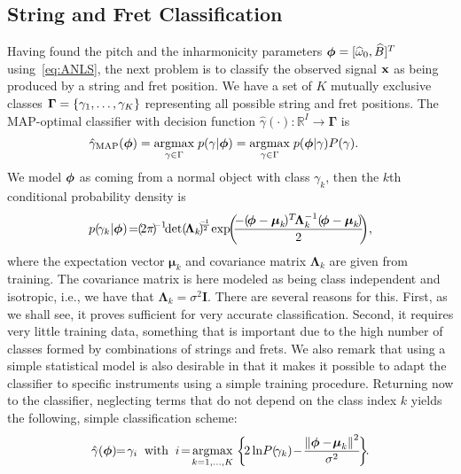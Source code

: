 \documentclass{article}
\begin{document}
\subsection{String and Fret Classification} %
\label{sec:proposed_classification_of_string_and_fret}
Having found the pitch and the inharmonicity parameters $\text{\boldmath$\phi$} = [\widehat\omega_0, \widehat B ]^T$ using~\eqref{eq:ANLS}, the next problem is to classify the observed signal $\mathbf x$ as being produced by a string and fret position. We have a set of $K$ mutually exclusive classes ${\mbox{\boldmath $\Gamma$}}=\{\gamma_1,\dots,\gamma_K\}$ representing all possible string and fret positions. The MAP-optimal classifier with decision function $\hat{\gamma}(\cdot)\!:\! \mathbb{R}^I \!\!\!\rightarrow \!\!\boldsymbol{\Gamma}  $ is~\cite{mspr}
\begin{align}
    \hat\gamma_{\textup{MAP}}(\text{\boldmath$\phi$}) &= \underset{\gamma\in\Gamma}{\operatorname{argmax}}\;{p(\gamma|\text{\boldmath$\phi$})} = \underset{\gamma\in\Gamma}{\operatorname{argmax}}\;{p(\text{\boldmath$\phi$}|\gamma)P(\gamma)}.
\end{align}
We model $\text{\boldmath$\phi$}$ as coming from a normal object with class $\gamma_k$, then the $k$th conditional probability density is   
\begin{equation}
    p(\!\gamma_k\lvert\vecphi)\! = \!\! {{(\!2\pi\!)^{\!\!-1}\!\!\det{\!(\!\boldsymbol{\Lambda}_k\!)\!^{\!\frac{\!-\!1}{2}}\!\!}}}\, \exp\!\!\bigg(\!\!\frac{-(\!\vecphi-\boldsymbol{\mu}_k\!)^T\!\boldsymbol{\Lambda}_k^{-1} (\!\vecphi-\boldsymbol{\mu}_k\!) }{2}\!\! \bigg),
\end{equation}
where the expectation vector $\boldsymbol{\mu}_k$ and covariance matrix $\boldsymbol{\Lambda}_k$ are given from training. The covariance matrix is here modeled as being class independent and isotropic, i.e., we have that $\boldsymbol{\Lambda}_k=\sigma^2\mathbf{I}$. There are several reasons for this. First, as we shall see, it proves sufficient for very accurate classification. Second, it requires very little training data, something that is important due to the high number of classes formed by combinations of strings and frets. We also remark that using a simple statistical model is also desirable in that it makes it possible to adapt the classifier to specific instruments using a simple training procedure. Returning now to the classifier, neglecting terms that do not depend on the class index $k$ yields the following, simple classification scheme:
\begin{equation}\label{eq:classifier}
  \hat{\gamma}(\vecphi)\!\!=\!{\gamma}_i \;\; \textup{with} \;\; 
  i\!=\!\argmax{k=1,\dots,K}
  {\bigg\{\!
   2\ln\! P(\!\gamma_k)\! -\! \frac{\norm{\vecphi-\!\boldsymbol{\mu}_k}^2}{\sigma^2}\! \bigg\}}\!.
\end{equation}
\end{document}
